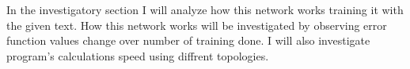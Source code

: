 In the investigatory section I will analyze how this network works training it with the given text. How this network works will be investigated by observing error function values change over number of training done. I will also investigate program's calculations speed using diffrent topologies.
\clearpage
%
